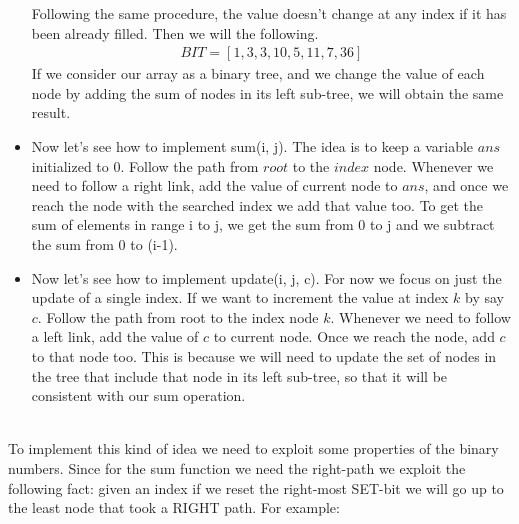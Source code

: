 \documentclass[a4paper]{article}
\begin{document}
\begin{itemize}
Following the same procedure, the value doesn't change at any index if it has been already filled. Then we will the following. 
\begin{align}
\nonumber
BIT=[1,3,3,10,5,11,7,36]
\end{align}
If we consider our array as a binary tree, and we change the value of each node by adding the sum of nodes in its left sub-tree, we will obtain the same result.
\item Now let's see how to implement sum(i, j). The idea is to keep a variable $ans$ initialized to 0. Follow the path from $root$ to the $index$ node. Whenever we need to follow a right link, add the value of current node to $ans$, and once we reach the node with the searched index we add that value too. To get the sum of elements in range i to j,  we get the sum from 0 to j and we subtract the sum from 0 to (i-1). 
\item Now let's see how to implement update(i, j, c). For now we focus on just the update of a single index. If we want to increment the value at index $k$ by say $c$. Follow the path from root to the index node $k$. Whenever we need to follow a left link, add the value of $c$ to current node. Once we reach the node, add $c$ to that node too. This is because we will need to update the set of nodes in the tree that include that node in its left sub-tree, so that it will be consistent with our sum operation.
\end{itemize}
\qquad \\

To implement this kind of idea we need to exploit some properties of the binary numbers. Since for the sum function we need the right-path we exploit the following fact: given an index if we reset the right-most SET-bit we will go up to the least node that took a RIGHT path. For example:
\end{document}
